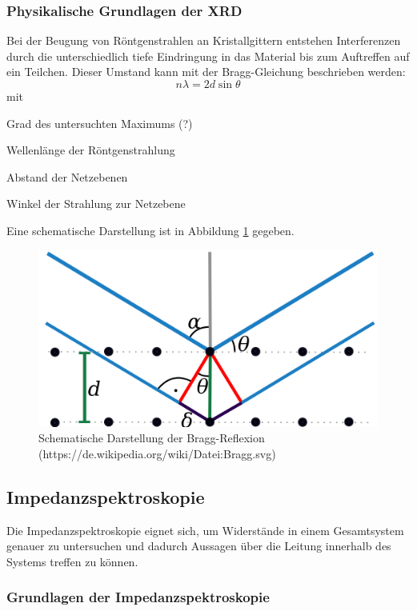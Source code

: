\documentclass[a4paper, 11pt, headsepline,footsepline,twoside,abstract]{scrbook}
\begin{document}
\subsubsection{Physikalische Grundlagen der XRD}
Bei der Beugung von Röntgenstrahlen an Kristallgittern entstehen Interferenzen durch die unterschiedlich tiefe Eindringung in das Material bis zum Auftreffen auf ein Teilchen. Dieser Umstand kann mit der Bragg-Gleichung beschrieben werden:
\begin{equation}
n\lambda = 2d \sin{\theta}
\end{equation}
mit
\begin{description}\itemsep0pt
\item[n] Grad des untersuchten Maximums (?)
\item[$\lambda$] Wellenlänge der Röntgenstrahlung
\item[d] Abstand der Netzebenen
\item[$\theta$] Winkel der Strahlung zur Netzebene
\end{description}
Eine schematische Darstellung ist in Abbildung \ref{bragg} gegeben.
\begin{figure}
	\centering
	\includegraphics[width=0.6\columnwidth]{images/Bragg.png}
	\caption{Schematische Darstellung der Bragg-Reflexion (https://de.wikipedia.org/wiki/Datei:Bragg.svg)}
	\label{bragg}
\end{figure}
\subsection{Impedanzspektroskopie}
Die Impedanzspektroskopie eignet sich, um Widerstände in einem Gesamtsystem genauer zu untersuchen und dadurch Aussagen über die Leitung innerhalb des Systems treffen zu können.
\subsubsection{Grundlagen der Impedanzspektroskopie}
\end{document}
